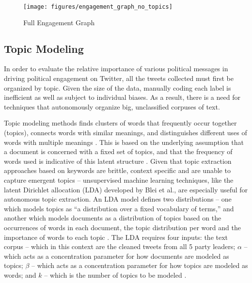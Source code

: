 \begin{figure}[h!]
  \centering
  \texttt{[image: figures/engagement\_graph\_no\_topics]}
  \caption[Full Engagement Graph]{Full Engagement Graph}
  \label{fig:engagement_graph_no_topics}
\end{figure}

\subsection{Topic Modeling}

In order to evaluate the relative importance of various political messages in
driving political engagement on Twitter, all the tweets collected must first be
organized by topic. Given the size of the data, manually coding each label is
inefficient as well as subject to individual biases. As a result, there is a
need for techniques that autonomously organize big, unclassified corpuses of
text. 

Topic modeling methods finds clusters of words that frequently occur together
(topics), connects words with similar meanings, and distinguishes different uses
of words with multiple meanings \cite{alghamdi2015survey}. This is based on the
underlying assumption that a document is concerned with a fixed set of topics,
and that the frequency of words used is indicative of this latent structure
\cite{blei2003latent}. Given that topic extraction approaches based on keywords
are brittle, context specific and are unable to capture emergent topics --
unsupervised machine learning techniques, like the latent Dirichlet allocation
(LDA) developed by Blei et al., are especially useful for autonomous topic
extraction. An LDA model defines two distributions -- one which models topics as
``a distribution over a fixed vocabulary of terms,'' and another which models
documents as a distribution of topics based on the occurrences of words in each
document, the topic distribution per word and the importance of words to each
topic \cite{blei2003latent}. The LDA requires four inputs: the text corpus --
which in this context are the cleaned tweets from all 5 party leaders; $\alpha$
-- which acts as a concentration parameter for how documents are modeled as
topics; $\beta$ -- which acts as a concentration parameter for how topics are
modeled as words; and $k$ -- which is the number of topics to be modeled
\cite{blei2003latent}.

